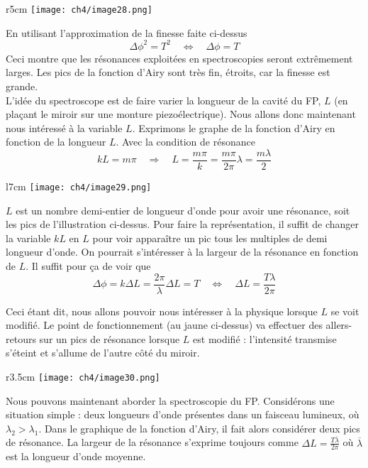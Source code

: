 	\begin{wrapfigure}[8]{r}{5cm}
	\vspace{-8mm}
	\texttt{[image: ch4/image28.png]}
	\end{wrapfigure}
En utilisant l'approximation de la finesse faite ci-dessus
\begin{equation}
\Delta\phi^2 = T^2\quad\Leftrightarrow\quad \Delta\phi = T
\end{equation}
Ceci montre que les résonances exploitées en spectroscopies seront extrêmement larges. Les pics de 
la fonction d'Airy sont très fin, étroits, car la finesse est grande.\\

L'idée du spectroscope est de faire varier la longueur de la cavité du FP, $L$ (en plaçant le miroir 
sur une monture piezoélectrique). Nous allons donc maintenant nous intéressé à la variable $L$. Exprimons 
le graphe de la fonction d'Airy en fonction de la longueur $L$. Avec la condition de résonance 
\begin{equation}
kL = m\pi\quad\Rightarrow\quad L=\frac{m\pi}{k} = \frac{m\pi}{2\pi}\lambda=\frac{m\lambda}{2}
\end{equation}

	\begin{wrapfigure}[9]{l}{7cm}
	\vspace{-8mm}
	\texttt{[image: ch4/image29.png]}
	\end{wrapfigure}
$L$ est un nombre demi-entier de longueur d'onde pour avoir une résonance, soit les pics de l'illustration 
ci-dessus. Pour faire la représentation, il suffit de changer la variable $kL$ en $L$ pour voir 
apparaître un pic tous les multiples de demi longueur d'onde. On pourrait s'intéresser à la largeur de la 
résonance en fonction de $L$. Il suffit pour ça de voir que
\begin{equation}
\Delta\phi = k\Delta L = \frac{2\pi}{\lambda}\Delta L = T\quad\Leftrightarrow\quad \Delta L = \frac{T\lambda}{
2\pi}
\end{equation}


Ceci étant dit, nous allons pouvoir nous intéresser à la physique lorsque $L$ se voit modifié. Le point 
de fonctionnement (au jaune ci-dessus) va effectuer des allers-retours sur un pics de résonance lorsque 
$L$ est modifié : l'intensité transmise s’éteint et s'allume de l'autre côté du miroir.\\

	\begin{wrapfigure}[9]{r}{3.5cm}
	\vspace{-8mm}
	\texttt{[image: ch4/image30.png]}
	\end{wrapfigure}
Nous pouvons maintenant aborder la spectroscopie du FP. Considérons une situation simple : deux longueurs 
d'onde présentes dans un faisceau lumineux, où $\lambda_2>\lambda_1$. Dans le graphique de la fonction 
d'Airy, il fait alors considérer deux pics de résonance. La largeur de la résonance s'exprime toujours 
comme $\Delta L = \frac{T\overline{\lambda}}{2\pi}$ où $\overline{\lambda}$ est la longueur d'onde moyenne.

